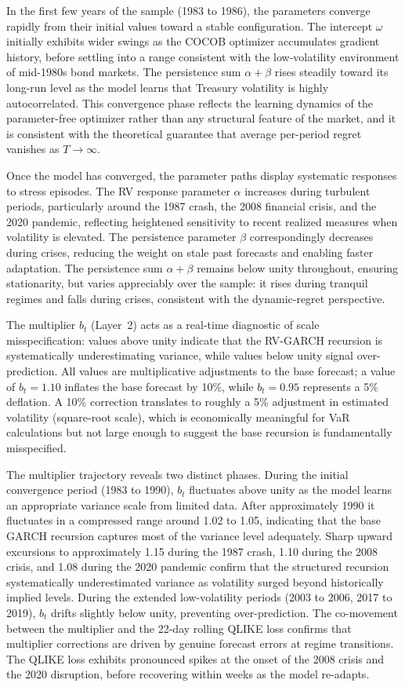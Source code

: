 In the first few years of the sample (1983 to 1986), the parameters converge rapidly from
their initial values toward a stable configuration. The intercept $\omega$ initially exhibits
wider swings as the COCOB optimizer accumulates gradient history, before settling into a range
consistent with the low-volatility environment of mid-1980s bond markets. The persistence sum
$\alpha+\beta$ rises steadily toward its long-run level as the model learns that Treasury
volatility is highly autocorrelated. This convergence phase reflects the learning dynamics of
the parameter-free optimizer rather than any structural feature of the market, and it is
consistent with the theoretical guarantee that average per-period regret vanishes as
$T \to \infty$.

Once the model has converged, the parameter paths display systematic responses to stress
episodes. The RV response parameter $\alpha$ increases during turbulent periods, particularly
around the 1987 crash, the 2008 financial crisis, and the 2020 pandemic, reflecting heightened
sensitivity to recent realized measures when volatility is elevated. The persistence parameter
$\beta$ correspondingly decreases during crises, reducing the weight on stale past forecasts
and enabling faster adaptation. The persistence sum $\alpha+\beta$ remains below unity
throughout, ensuring stationarity, but varies appreciably over the sample: it rises during
tranquil regimes and falls during crises, consistent with the dynamic-regret perspective.

The multiplier $b_t$ (Layer~2) acts as a real-time diagnostic of scale misspecification: values
above unity indicate that the RV-GARCH recursion is systematically underestimating variance,
while values below unity signal over-prediction. All values are multiplicative adjustments to
the base forecast; a value of $b_t = 1.10$ inflates the base forecast by 10\%, while
$b_t = 0.95$ represents a 5\% deflation. A 10\% correction translates to roughly a 5\%
adjustment in estimated volatility (square-root scale), which is economically meaningful for
VaR calculations but not large enough to suggest the base recursion is fundamentally
misspecified.

The multiplier trajectory reveals two distinct phases. During the initial convergence period
(1983 to 1990), $b_t$ fluctuates above unity as the model learns an appropriate variance scale
from limited data. After approximately 1990 it fluctuates in a compressed range around 1.02
to 1.05, indicating that the base GARCH recursion captures most of the variance level
adequately. Sharp upward excursions to approximately 1.15 during the 1987 crash, 1.10 during
the 2008 crisis, and 1.08 during the 2020 pandemic confirm that the structured recursion
systematically underestimated variance as volatility surged beyond historically implied levels.
During the extended low-volatility periods (2003 to 2006, 2017 to 2019), $b_t$ drifts
slightly below unity, preventing over-prediction. The co-movement between the multiplier and
the 22-day rolling QLIKE loss confirms that multiplier corrections are driven by genuine
forecast errors at regime transitions. The QLIKE loss exhibits pronounced spikes at the onset
of the 2008 crisis and the 2020 disruption, before recovering within weeks as the model
re-adapts.

